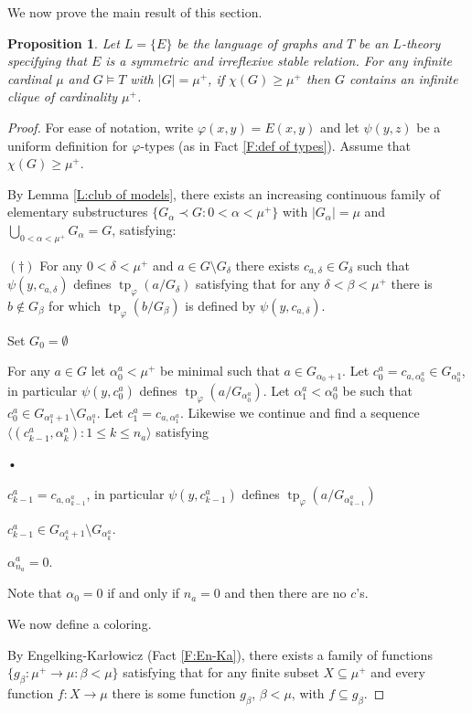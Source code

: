 \documentclass[a4paper]{amsart}
\theoremstyle{plain}
\newtheorem{proposition}[theorem]{Proposition}
\theoremstyle{definition}
\theoremstyle{remark}
\numberwithin{equation}{section}
\DeclareMathOperator{\tp}{tp}
\begin{document}
We now prove the main result of this section.

\begin{proposition}\label{P:stable}
Let $L=\{E\}$ be the language of graphs and $T$ be an $L$-theory specifying that $E$ is a symmetric and irreflexive stable relation. For any infinite cardinal $\mu$ and $G\vDash T$ with $|G|=\mu^+$, if $\chi(G)\geq \mu^+$ then $G$ contains an infinite clique of cardinality $\mu^+$.
\end{proposition}
\begin{proof}
For ease of notation, write $\varphi(x,y)=E(x,y)$ and let $\psi(y,z)$ be a uniform definition for $\varphi$-types (as in Fact \ref{F:def of types}). Assume that $\chi(G)\geq \mu^+$.

By Lemma \ref{L:club of models}, there exists an increasing  continuous family of elementary substructures $\{G_\alpha\prec G:0<\alpha<\mu^+\}$   with $|G_\alpha|=\mu$ and $\bigcup_{0<\alpha<\mu^+} G_\alpha=G$, satisfying:

$(\dagger)$ For any $0<\delta<\mu^+$ and $a\in G\setminus G_\delta$  there exists $c_{a,\delta}\in G_\delta$ such that $\psi(y,c_{a,\delta})$ defines $\tp_\varphi(a/G_\delta)$ satisfying that  for any $\delta<\beta<\mu^+$ there is $b\notin G_\beta$ for which $\tp_\varphi(b/G_\beta)$ is defined by $\psi(y,c_{a,\delta})$. 

Set $G_0=\emptyset$

For any $a\in G$ let $\alpha^a_0<\mu^+$ be minimal such that $a\in G_{\alpha_0+1}$. Let $c_0^a=c_{a,\alpha_0^a}\in G_{\alpha^a_0}$, in particular $\psi(y,c_0^a)$ defines $\tp_\varphi (a/G_{\alpha^a_0})$. Let $\alpha_1^a<\alpha_0^a$ be such that $c_0^a\in G_{\alpha_1^a+1}\setminus G_{\alpha^a_1}$. Let $c^a_1=c_{a,\alpha_1^a}$. Likewise we continue and find a sequence $\langle (c_{k-1}^a,\alpha_k^a):1\leq k\leq n_a\rangle$ satisfying
\begin{list}{•}{}
\item $c^a_{k-1}=c_{a,\alpha^a_{k-1}}$, in particular $\psi(y,c^a_{k-1})$ defines $\tp_\varphi(a/G_{\alpha^a_{k-1}})$
\item $c^a_{k-1}\in G_{\alpha^a_k+1}\setminus G_{\alpha^a_k}$. 
\item $\alpha^a_{n_a}=0$.
\end{list}

Note that $\alpha_0=0$ if and only if $n_a=0$ and then there are no $c$'s.

We now define a coloring.

By  Engelking-Kar\l owicz (Fact \ref{F:En-Ka}), there exists a family of functions $\{g_{\beta}:\mu^+\to \mu:\beta<\mu\}$ satisfying that for any finite subset $X\subseteq \mu^+$ and every function $f:X\to \mu$ there is some function $g_\beta$, $\beta<\mu$, with $f\subseteq g_\beta$.



\end{proof}
\end{document}
